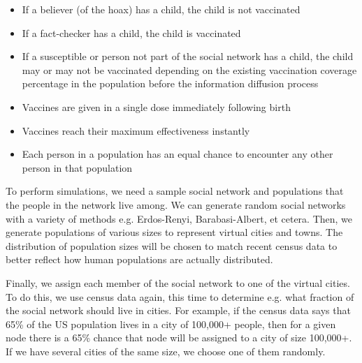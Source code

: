 \documentclass[conference]{IEEEtran}
\begin{document}
\begin{itemize}
    \item If a believer (of the hoax) has a child, the child is not vaccinated
    \item If a fact-checker has a child, the child is vaccinated
    \item If a susceptible or person not part of the social network has a child, the child may or may not be vaccinated depending on the existing vaccination coverage percentage in the population before the information diffusion process
    \item Vaccines are given in a single dose immediately following birth
    \item Vaccines reach their maximum effectiveness instantly
    \item Each person in a population has an equal chance to encounter any other person in that population
\end{itemize}

To perform simulations, we need a sample social network and populations that the people in the network live among. We can generate random social networks with a variety of methods e.g. Erdos-Renyi, Barabasi-Albert, et cetera. Then, we generate populations of various sizes to represent virtual cities and towns. The distribution of population sizes will be chosen to match recent census data to better reflect how human populations are actually distributed. 

Finally, we assign each member of the social network to one of the virtual cities. To do this, we use census data again, this time to determine e.g. what fraction of the social network should live in cities. For example, if the census data says that 65\% of the US population lives in a city of 100,000+ people, then for a given node there is a 65\% chance that node will be assigned to a city of size 100,000+. If we have several cities of the same size, we choose one of them randomly.



\end{document}
